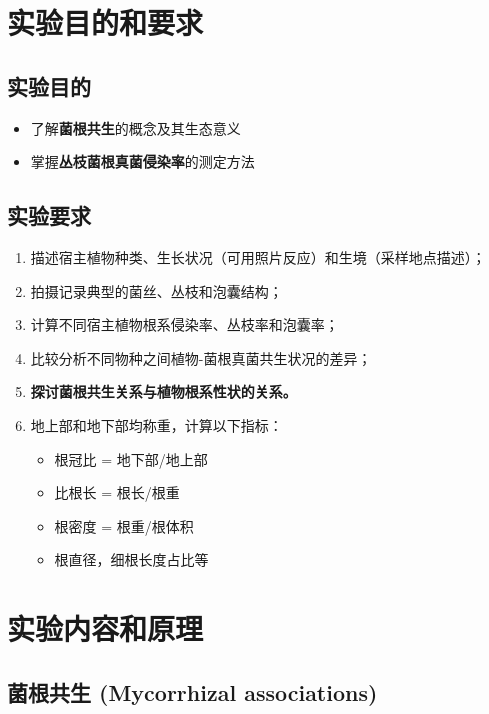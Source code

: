 \documentclass[10.5pt]{config}
\date{2025.12.3}
\begin{document}
\makeheader %


\section{实验目的和要求}

\subsection{实验目的}
\begin{itemize}
    \item 了解\textbf{菌根共生}的概念及其生态意义
    \item 掌握\textbf{丛枝菌根真菌侵染率}的测定方法
\end{itemize}

\subsection{实验要求}
\begin{enumerate}
    \item 描述宿主植物种类、生长状况（可用照片反应）和生境（采样地点描述）；
    \item 拍摄记录典型的菌丝、丛枝和泡囊结构；
    \item 计算不同宿主植物根系侵染率、丛枝率和泡囊率；
    \item 比较分析不同物种之间植物-菌根真菌共生状况的差异；
    \item \textbf{探讨菌根共生关系与植物根系性状的关系。}
    \item 地上部和地下部均称重，计算以下指标：
    \begin{itemize}
        \item[1.] 根冠比 = 地下部/地上部
        \item[2.] 比根长 = 根长/根重
        \item[3.] 根密度 = 根重/根体积
        \item[4.] 根直径，细根长度占比等
    \end{itemize}
\end{enumerate}

\section{实验内容和原理}

\subsection{菌根共生 (Mycorrhizal associations)}
\end{document}
